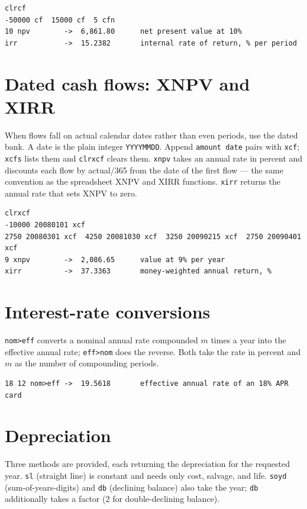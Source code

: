 \documentclass[11pt]{article}
\newcommand{\w}[1]{\texttt{#1}}
\begin{document}
\begin{lstlisting}
clrcf
-50000 cf  15000 cf  5 cfn
10 npv        ->  6,861.80      net present value at 10%
irr           ->  15.2382       internal rate of return, % per period
\end{lstlisting}

\section{Dated cash flows: XNPV and XIRR}

When flows fall on actual calendar dates rather than even periods, use the
dated bank. A date is the plain integer \w{YYYYMMDD}. Append \w{amount date}
pairs with \w{xcf}; \w{xcfs} lists them and \w{clrxcf} clears them. \w{xnpv}
takes an annual rate in percent and discounts each flow by actual/365 from the
date of the first flow --- the same convention as the spreadsheet XNPV and
XIRR functions. \w{xirr} returns the annual rate that sets XNPV to zero.

\begin{lstlisting}
clrxcf
-10000 20080101 xcf
2750 20080301 xcf  4250 20081030 xcf  3250 20090215 xcf  2750 20090401 xcf
9 xnpv        ->  2,086.65      value at 9% per year
xirr          ->  37.3363       money-weighted annual return, %
\end{lstlisting}

\section{Interest-rate conversions}

\w{nom>eff} converts a nominal annual rate compounded $m$ times a year into the
effective annual rate; \w{eff>nom} does the reverse. Both take the rate in
percent and $m$ as the number of compounding periods.

\begin{lstlisting}
18 12 nom>eff ->  19.5618       effective annual rate of an 18% APR card
\end{lstlisting}

\section{Depreciation}

Three methods are provided, each returning the depreciation for the requested
year. \w{sl} (straight line) is constant and needs only cost, salvage, and
life. \w{soyd} (sum-of-years-digits) and \w{db} (declining balance) also take
the year; \w{db} additionally takes a factor (2 for double-declining balance).
\end{document}
